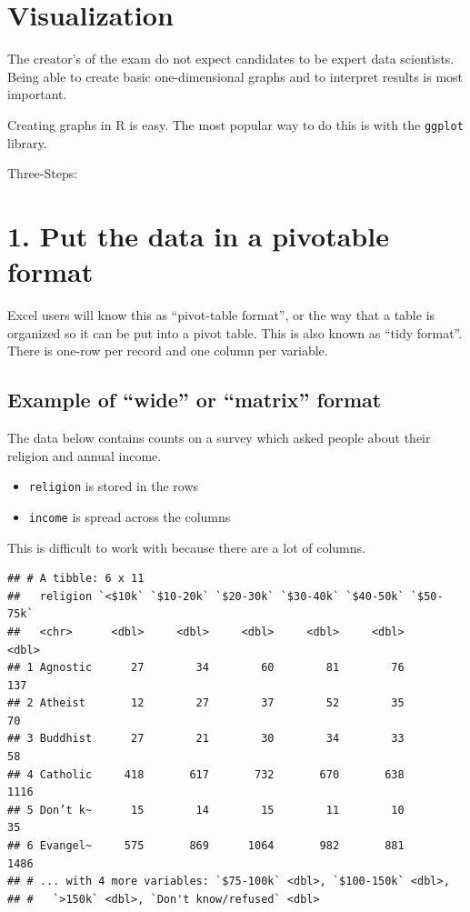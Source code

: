 \documentclass[]{book}
\providecommand{\tightlist}{%
  \setlength{\itemsep}{0pt}\setlength{\parskip}{0pt}}
\begin{document}
\hypertarget{visualization}{%
\chapter{Visualization}\label{visualization}}

The creator's of the exam do not expect candidates to be expert data scientists. Being able to create basic one-dimensional graphs and to interpret results is most important.

Creating graphs in R is easy. The most popular way to do this is with the \texttt{ggplot} library.

Three-Steps:

\hypertarget{put-the-data-in-a-pivotable-format}{%
\chapter{1. Put the data in a pivotable format}\label{put-the-data-in-a-pivotable-format}}

Excel users will know this as ``pivot-table format'', or the way that a table is organized so it can be put into a pivot table. This is also known as ``tidy format''. There is one-row per record and one column per variable.

\hypertarget{example-of-wide-or-matrix-format}{%
\section{Example of ``wide'' or ``matrix'' format}\label{example-of-wide-or-matrix-format}}

The data below contains counts on a survey which asked people about their religion and annual income.

\begin{itemize}
\tightlist
\item
  \texttt{religion} is stored in the rows
\item
  \texttt{income} is spread across the columns
\end{itemize}

This is difficult to work with because there are a lot of columns.

\begin{verbatim}
## # A tibble: 6 x 11
##   religion `<$10k` `$10-20k` `$20-30k` `$30-40k` `$40-50k` `$50-75k`
##   <chr>      <dbl>     <dbl>     <dbl>     <dbl>     <dbl>     <dbl>
## 1 Agnostic      27        34        60        81        76       137
## 2 Atheist       12        27        37        52        35        70
## 3 Buddhist      27        21        30        34        33        58
## 4 Catholic     418       617       732       670       638      1116
## 5 Don’t k~      15        14        15        11        10        35
## 6 Evangel~     575       869      1064       982       881      1486
## # ... with 4 more variables: `$75-100k` <dbl>, `$100-150k` <dbl>,
## #   `>150k` <dbl>, `Don't know/refused` <dbl>
\end{verbatim}
\end{document}
